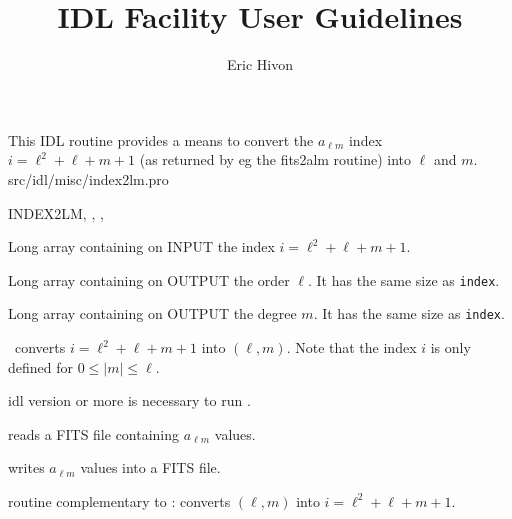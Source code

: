 
\sloppy

\title{\healpix IDL Facility User Guidelines}
 \section[index2lm]{ }
\label{idl:index2lm}
\author{Eric Hivon}

\begin{facility}
{This IDL routine provides a means to convert the $a_{\ell m}$ index $i=\ell^2 +
\ell + m + 1$ (as returned by eg the fits2alm routine) into $\ell$ and $m$.}
{src/idl/misc/index2lm.pro}

\end{facility}


\begin{IDLformat}
{INDEX2LM, 
, 
, 
}
\end{IDLformat}

\begin{qualifiers}
  \begin{qulist}{} %
    \item[index\mytarget{idl:index2lm:index}%
] Long array containing on INPUT the index \hfill\newline
                 $i=\ell^2 + \ell + m + 1$.
    \item[l\mytarget{idl:index2lm:l}%
] Long array containing on OUTPUT the order $\ell$. It has the same
    size as {\tt index}.
    \item[m\mytarget{idl:index2lm:m}%
] Long array containing on OUTPUT the degree $m$. It has the same
    size as {\tt index}.
  \end{qulist}
\end{qualifiers}

\begin{codedescription}
{\thedocid\ converts $i=\ell^2 + \ell + m + 1$ into $(\ell, m)$. Note that the index $i$ is only
defined for $0 \le |m|\le \ell$.
}
\end{codedescription}



\begin{related}
  \begin{sulist}{} %
    \item[idl] version \idlversion or more is necessary to run \thedocid.
    \item[\htmlref{fits2alm}{idl:fits2alm}] reads a FITS file containing
    $a_{\ell m}$ values.
    \item[\htmlref{alm2fits}{idl:alm2fits}] writes $a_{\ell m}$ values into a FITS file.
    \item[\htmlref{lm2index}{idl:lm2index}] routine complementary to \thedocid:
    converts $(\ell, m)$ into $i=\ell^2 + \ell + m + 1$.
  \end{sulist}
\end{related}

